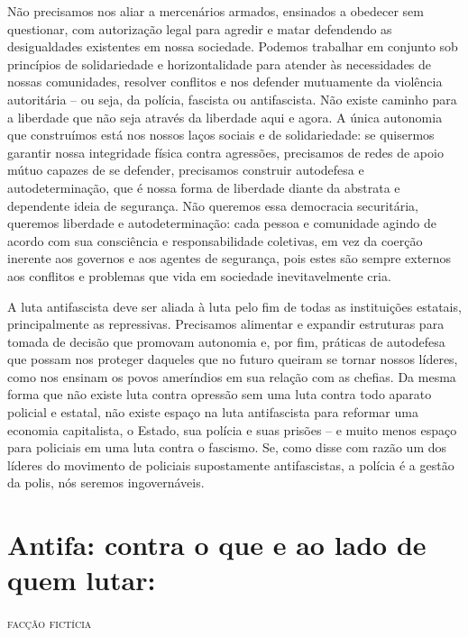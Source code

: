 Não precisamos nos aliar a mercenários armados, ensinados a obedecer sem questionar, com autorização legal para agredir e matar defendendo as desigualdades existentes em nossa sociedade. Podemos trabalhar em conjunto sob princípios de solidariedade e horizontalidade para atender às necessidades de nossas comunidades, resolver conflitos e nos defender mutuamente da violência autoritária – ou seja, da polícia, fascista ou antifascista. Não existe caminho para a liberdade que não seja através da liberdade aqui e agora. A única autonomia que construímos está nos nossos laços sociais e de solidariedade: se quisermos garantir nossa integridade física contra agressões, precisamos de redes de apoio mútuo capazes de se defender, precisamos construir autodefesa e autodeterminação, que é nossa forma de liberdade diante da abstrata e dependente ideia de segurança. Não queremos essa democracia securitária, queremos liberdade e autodeterminação: cada pessoa e comunidade agindo de acordo com sua consciência e responsabilidade coletivas, em vez da coerção inerente aos governos e aos agentes de segurança, pois estes são sempre externos aos conflitos e problemas que vida em sociedade inevitavelmente cria.

A luta antifascista deve ser aliada à luta pelo fim de todas as instituições estatais, principalmente as repressivas. Precisamos alimentar e expandir estruturas para tomada de decisão que promovam autonomia e, por fim, práticas de autodefesa que possam nos proteger daqueles que no futuro queiram se tornar nossos líderes, como nos ensinam os povos ameríndios em sua relação com as chefias. Da mesma forma que não existe luta contra opressão sem uma luta contra todo aparato policial e estatal, não existe espaço na luta antifascista para reformar uma economia capitalista, o Estado, sua polícia e suas prisões – e muito menos espaço para policiais em uma luta contra o fascismo. Se, como disse com razão um dos líderes do movimento de policiais supostamente antifascistas, a polícia é a gestão da polis, nós seremos ingovernáveis.

\chapter*{Antifa: contra o que e ao lado de quem lutar: }


\hfill{}\textsc{facção fictícia}

